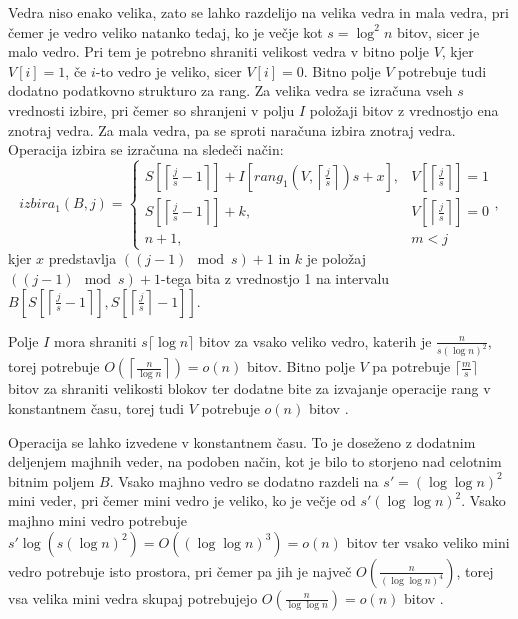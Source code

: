 Vedra niso enako velika, zato se lahko razdelijo na velika vedra in mala vedra, pri čemer je vedro veliko natanko tedaj, ko je večje kot $s=\log^2 n$ bitov, sicer je malo vedro. Pri tem je potrebno shraniti velikost vedra v bitno polje $V$, kjer $V[i]=1$, če $i$-to vedro je veliko, sicer  $V[i]=0$. Bitno polje $V$ potrebuje tudi dodatno podatkovno strukturo za rang. Za velika vedra se izračuna vseh $s$ vrednosti izbire, pri čemer so shranjeni v polju $I$ položaji bitov z vrednostjo ena znotraj vedra. Za mala vedra, pa se sproti naračuna izbira znotraj vedra. Operacija izbira se izračuna na sledeči način:
\begin{equation}
    izbira_1(B,j)=\left\{
    \begin{array}{rl}
       S\left[\left\lceil \frac{j}{s} -1\right\rceil\right] + I\left[rang_1(V,\left\lceil \frac{j}{s} \right\rceil)s+x\right], & V\left[\left\lceil \frac{j}{s} \right\rceil\right] = 1\\ 
       S\left[\left\lceil \frac{j}{s} -1 \right\rceil\right] + k, & V\left[\left\lceil \frac{j}{s} \right\rceil\right] = 0\\
       n+1, & m < j
    \end{array}\right.,
\end{equation}
kjer $x$ predstavlja $((j-1) \mod{s})+1$ in $k$ je položaj $((j-1) \mod{s})+1$-tega bita z vrednostjo 1 na intervalu $B\left[ S\left[\left\lceil \frac{j}{s} -1 \right\rceil\right], S\left[\left\lceil \frac{j}{s} \right\rceil-1\right]\right]$.

Polje $I$ mora shraniti $s\lceil\log n\rceil$ bitov za vsako veliko vedro, katerih je $\frac{n}{s(\log n)^2}$, torej potrebuje $O\left(\left\lceil\frac{n}{\log n}\right\rceil\right)=o(n)$ bitov. Bitno polje $V$ pa potrebuje $\lceil \frac{m}{s} \rceil$ bitov za shraniti velikosti blokov ter dodatne bite za izvajanje operacije rang v konstantnem času, torej tudi $V$ potrebuje $o(n)$ bitov \cite{Navarro2016}.

Operacija se lahko izvedene v konstantnem času. To je doseženo z dodatnim deljenjem majhnih veder, na podoben način, kot je bilo to storjeno nad celotnim bitnim poljem $B$. Vsako majhno vedro se dodatno razdeli na $s'=(\log\log n)^2$ mini veder, pri čemer mini vedro je veliko, ko je večje od $s'(\log\log n)^2$. Vsako majhno mini vedro potrebuje $s'\log{(s(\log{n})^2)}=O((\log\log n)^3)=o(n)$ bitov ter vsako veliko mini vedro potrebuje isto prostora, pri čemer pa jih je največ $O\left(\frac{n}{(\log\log n)^4}\right)$, torej vsa velika mini vedra skupaj potrebujejo $O\left(\frac{n}{\log\log n}\right) =o(n)$ bitov \cite{Navarro2016}.


